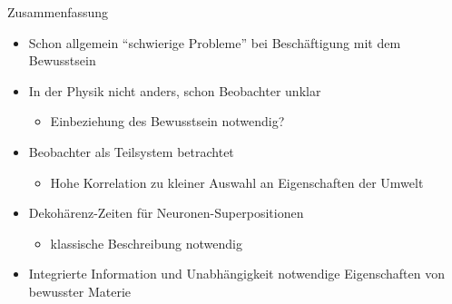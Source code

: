 \begin{frame}{Zusammenfassung}
	\begin{itemize}
		\item{Schon allgemein \enquote{schwierige Probleme} bei
			  Beschäftigung mit dem Bewusstsein}
		\item{In der Physik nicht anders, schon Beobachter unklar}
			\begin{itemize}
				\item{Einbeziehung des Bewusstsein notwendig?}
			\end{itemize}
		\item{Beobachter als Teilsystem betrachtet}
			\begin{itemize}
				\item{Hohe Korrelation zu kleiner Auswahl an Eigenschaften der Umwelt}
			\end{itemize}
		\item{Dekohärenz-Zeiten für Neuronen-Superpositionen}
					\begin{itemize}
						\item{klassische Beschreibung notwendig}
					\end{itemize}
		\item{Integrierte Information und Unabhängigkeit notwendige Eigenschaften von
			  bewusster Materie}
	\end{itemize}
\end{frame}